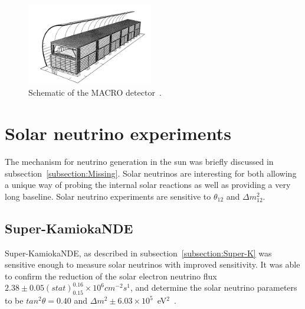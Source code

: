 \begin{figure}[h!]
\centering
  \centering
\includegraphics[width=0.49\textwidth]{figures/MACRO.jpeg}
\vspace{2mm}
\caption{Schematic of the MACRO detector~\cite{61MACRO}.}
\label{fig:macro}
\end{figure}

\pagebreak
\newpage
\section{Solar neutrino experiments}
The mechanism for neutrino generation in the sun was briefly discussed in subsection~\ref{subsection:Missing}.
Solar neutrinos are interesting for both allowing a unique way of probing the internal solar reactions  as well as providing a very long baseline. Solar neutrino experiments are sensitive to $\theta_{12}$ and $\Delta m^2_{12}$.



\subsection{Super-KamiokaNDE}


Super-KamiokaNDE, as described in subsection~\ref{subsection:Super-K} was sensitive enough to measure solar neutrinos with improved sensitivity. It was able to confirm the reduction of the solar electron neutrino flux $2.38 \pm 0.05(stat) ^{0.16}_{0.15} \times 10^6 cm^{-2} s^1$, and determine the solar neutrino parameters to be $tan^2 \theta = 0.40$ and $\Delta m^2 \pm 6.03\times 10^5$~eV$^2$~\cite{64SuperK}.

